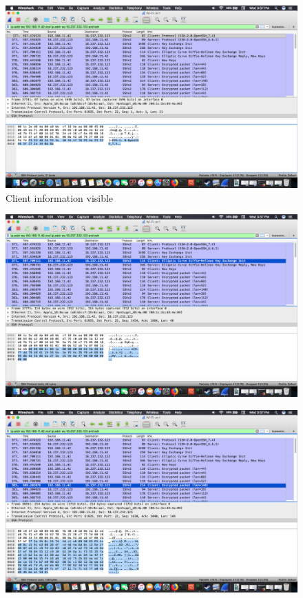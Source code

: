 \documentclass{article}
\begin{document}
\begin{figure}[h]
	\includegraphics[width=\linewidth]{ssh1.png}
	\caption{Client information visible}
	\label{fig:ssh1}
\end{figure}
\begin{figure}[h]
	\includegraphics[width=\linewidth]{ssh2.png}
	\caption{}
	\label{}
\end{figure}
\begin{figure}[h]
	\includegraphics[width=\linewidth]{ssh3.png}
	\caption{}
	\label{}
\end{figure}
\end{document}
